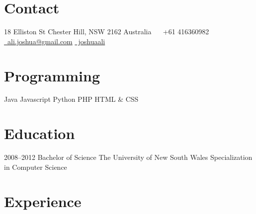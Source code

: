\documentclass[]{friggeri-cv} %
\begin{document}


\begin{aside} %
\section{Contact}
18 Elliston St
Chester Hill, NSW 2162
Australia
~
{\Large\faMobilePhone}~+61 416360982
~
\href{mailto:ali.joshua@gmail.com}{{\faEnvelope}~ali.joshua@gmail.com}
\href{https://www.linkedin.com/in/joshuaali}{{\faLinkedinSign}~joshuaali}
\section{Programming}
Java
Javascript
Python
PHP
HTML \& CSS
\end{aside}


\section{Education}

\begin{entrylist}


\entry
{2008--2012}
{Bachelor {\normalfont of Science}}
{The University of New South Wales}
{Specialization in Computer Science}


\end{entrylist}


\section{Experience}
\end{document}
